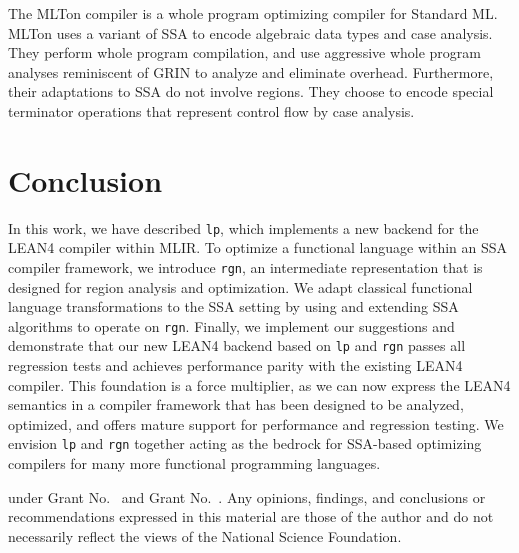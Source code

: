 \documentclass[conference]{IEEEtran}
\newcommand{\lp}{\textcolor{pairedTwoDarkBlue}{\texttt{lp}}}
\newcommand{\rgn}{\textcolor{pairedSixDarkRed}{\texttt{rgn}}}
\begin{document}
The MLTon compiler \cite{weeks2006whole} is a whole program optimizing compiler
for Standard ML. MLTon uses a variant of SSA to encode algebraic data types and
case analysis. They perform whole program compilation, and use aggressive whole
program analyses reminiscent of GRIN to analyze and eliminate overhead.
Furthermore, their adaptations to SSA do not involve regions. They choose to
encode special terminator operations that represent control flow by case
analysis.
\section{Conclusion}

In this work, we have described \lp{}, which implements a new backend for the LEAN4
compiler within MLIR. To optimize a functional language within an SSA compiler
framework, we introduce \rgn{}, an intermediate representation
that is designed for region analysis and optimization. We adapt classical
functional language transformations to the SSA setting by using and
extending SSA algorithms to operate on \rgn{}. Finally, we implement our
suggestions and demonstrate that our new LEAN4 backend based on \lp{} and \rgn{}
passes all regression tests and achieves performance parity with the existing
LEAN4 compiler. This foundation is  a force multiplier, as we can now express the
LEAN4 semantics in a compiler framework that has been designed to be analyzed,
optimized, and offers mature support for performance and regression testing. We
envision \lp{} and \rgn{}
together acting as the bedrock for SSA-based optimizing compilers for many more functional
programming languages.


\ifx\paperversion\paperversioncameraIEEE
\else
\begin{acks}                            %

  under Grant
  No.~ and Grant
  No.~.  Any opinions, findings, and
  conclusions or recommendations expressed in this material are those
  of the author and do not necessarily reflect the views of the
  National Science Foundation.
\end{acks}
\fi
\end{document}
